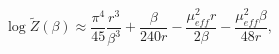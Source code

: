 \begin{equation}
\log \widetilde{Z}\left(\beta \right)\approx \frac{\pi ^{4}}{45}\frac{r^{3}}{\beta ^{3}}+\frac{\beta }{240r}-\frac{\mu _{eff}^{2}r}{2\beta }-\frac{\mu _{eff}^{2}\beta }{48r},\end{equation}

